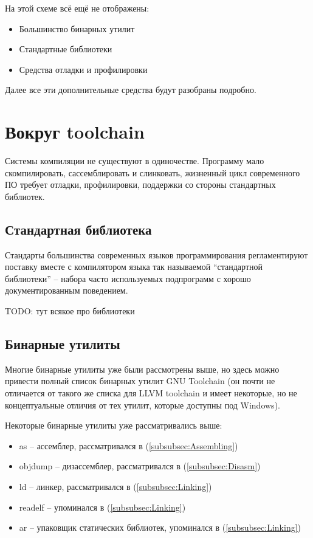 \documentclass[a4paper,12pt,oneside]{article}
\begin{document}
На этой схеме всё ещё не отображены:

\begin{itemize}
\item Большинство бинарных утилит
\item Стандартные библиотеки
\item Средства отладки и профилировки
\end{itemize}

Далее все эти дополнительные средства будут разобраны подробно.

\pagebreak
\section{Вокруг toolchain}\label{sec:AroundToolchain}

Системы компиляции не существуют в одиночестве. Программу мало скомпилировать, сассемблировать и слинковать, жизненный цикл современного ПО требует отладки, профилировки, поддержки со стороны стандартных библиотек.

\subsection{Стандартная библиотека}\label{subsec:Library}

Стандарты большинства современных языков программирования регламентируют поставку вместе с компилятором языка так называемой ``стандартной библиотеки'' -- набора часто используемых подпрограмм с хорошо документированным поведением.

TODO: тут всякое про библиотеки

\subsection{Бинарные утилиты}\label{subsec:Binutils}

Многие бинарные утилиты уже были рассмотрены выше, но здесь можно привести полный список бинарных утилит GNU Toolchain (он почти не отличается от такого же списка для LLVM toolchain и имеет некоторые, но не концептуальные отличия от тех утилит, которые доступны под Windows).


Некоторые бинарные утилиты уже рассматривались выше:

\begin{itemize}
\item as -- ассемблер, рассматривался в (\ref{subsubsec:Assembling})
\item objdump -- дизассемблер, рассматривался в (\ref{subsubsec:Disasm})
\item ld -- линкер, рассматривался в (\ref{subsubsec:Linking})
\item readelf -- упоминался в (\ref{subsubsec:Linking})
\item ar -- упаковщик статических библиотек, упоминался в (\ref{subsubsec:Linking})
\end{itemize}
\end{document}

